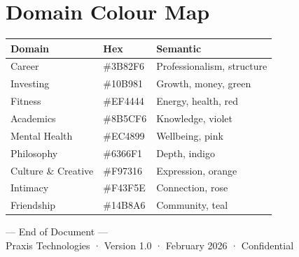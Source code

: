 \documentclass[11pt,a4paper]{article}
\begin{document}
\section{Domain Colour Map}

\begin{center}
\begin{tabular}{lll}
\toprule
\textbf{Domain} & \textbf{Hex} & \textbf{Semantic} \\
\midrule
Career & \#3B82F6 & Professionalism, structure \\
Investing & \#10B981 & Growth, money, green \\
Fitness & \#EF4444 & Energy, health, red \\
Academics & \#8B5CF6 & Knowledge, violet \\
Mental Health & \#EC4899 & Wellbeing, pink \\
Philosophy & \#6366F1 & Depth, indigo \\
Culture \& Creative & \#F97316 & Expression, orange \\
Intimacy & \#F43F5E & Connection, rose \\
Friendship & \#14B8A6 & Community, teal \\
\bottomrule
\end{tabular}
\end{center}

\bigskip\bigskip
\begin{center}
\textcolor{midgray}{\small --- End of Document ---}\\[4pt]
\textcolor{midgray}{\small Praxis Technologies · Version 1.0 · February 2026 · Confidential}
\end{center}
\end{document}
